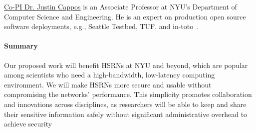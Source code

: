 \underline{Co-PI Dr. Justin Cappos} is an Associate Professor at NYU's Department of Computer Science and Engineering. He is an expert on production open source software deployments, e.g., Seattle Testbed, TUF, and in-toto~\cite{Cappos_CCS_2010, Samuel_CCS_2010, Torres_USENIXSec_2016, Nikitin_USENIXSec_2017, in-toto-paper,Zhuang_NSDI_2014,Kuppusamy_NSDI_2016}.

\paragraph{Summary}
Our proposed work will benefit HSRNs at NYU and beyond, which are popular among scientists who need a high-bandwidth, low-latency computing environment. We will make HSRNs more secure and usable without compromising the networks' performance. This simplicity promotes collaboration and innovations across disciplines, as researchers will be able to keep and share their sensitive information safely without significant administrative overhead to achieve security



